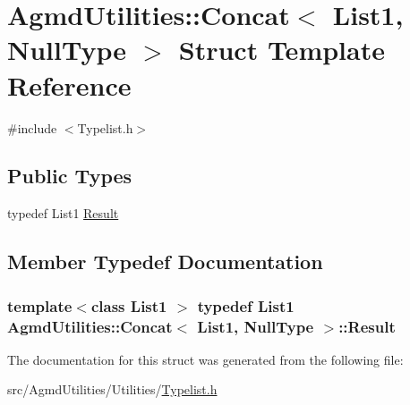 \hypertarget{struct_agmd_utilities_1_1_concat_3_01_list1_00_01_null_type_01_4}{\section{Agmd\+Utilities\+:\+:Concat$<$ List1, Null\+Type $>$ Struct Template Reference}
\label{struct_agmd_utilities_1_1_concat_3_01_list1_00_01_null_type_01_4}
}


{\ttfamily \#include $<$Typelist.\+h$>$}

\subsection*{Public Types}
\begin{DoxyCompactItemize}
\item 
typedef List1 \hyperlink{struct_agmd_utilities_1_1_concat_3_01_list1_00_01_null_type_01_4_ac0662df5204398fbb28cfb200526d528}{Result}
\end{DoxyCompactItemize}


\subsection{Member Typedef Documentation}
\hypertarget{struct_agmd_utilities_1_1_concat_3_01_list1_00_01_null_type_01_4_ac0662df5204398fbb28cfb200526d528}{
\subsubsection[{Result}]{\setlength{\rightskip}{0pt plus 5cm}template$<$class List1 $>$ typedef List1 {\bf Agmd\+Utilities\+::\+Concat}$<$ List1, {\bf Null\+Type} $>$\+::{\bf Result}}}\label{struct_agmd_utilities_1_1_concat_3_01_list1_00_01_null_type_01_4_ac0662df5204398fbb28cfb200526d528}


The documentation for this struct was generated from the following file\+:\begin{DoxyCompactItemize}
\item 
src/\+Agmd\+Utilities/\+Utilities/\hyperlink{_typelist_8h}{Typelist.\+h}\end{DoxyCompactItemize}
